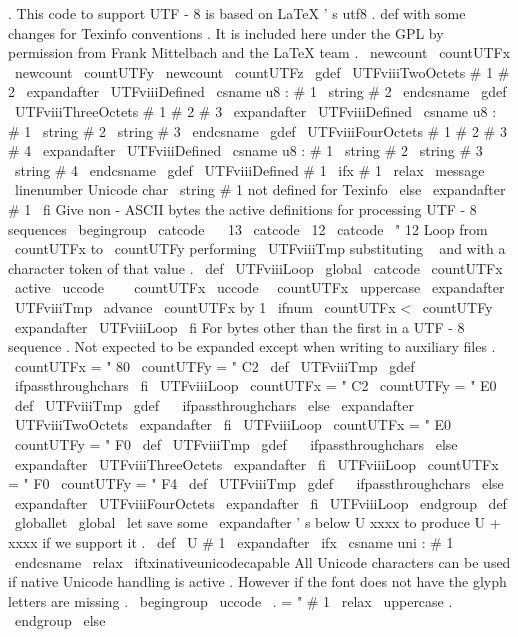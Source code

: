 {{{{.
%
%
This
code
to
support
UTF
-
8
is
based
on
LaTeX
'
s
utf8
.
def
with
some
%
changes
for
Texinfo
conventions
.
It
is
included
here
under
the
GPL
by
%
permission
from
Frank
Mittelbach
and
the
LaTeX
team
.
%
\
newcount
\
countUTFx
\
newcount
\
countUTFy
\
newcount
\
countUTFz
\
gdef
\
UTFviiiTwoOctets
#
1
#
2
{
\
expandafter
\
UTFviiiDefined
\
csname
u8
:
#
1
\
string
#
2
\
endcsname
}
%
\
gdef
\
UTFviiiThreeOctets
#
1
#
2
#
3
{
\
expandafter
\
UTFviiiDefined
\
csname
u8
:
#
1
\
string
#
2
\
string
#
3
\
endcsname
}
%
\
gdef
\
UTFviiiFourOctets
#
1
#
2
#
3
#
4
{
\
expandafter
\
UTFviiiDefined
\
csname
u8
:
#
1
\
string
#
2
\
string
#
3
\
string
#
4
\
endcsname
}
\
gdef
\
UTFviiiDefined
#
1
{
%
\
ifx
#
1
\
relax
\
message
{
\
linenumber
Unicode
char
\
string
#
1
not
defined
for
Texinfo
}
%
\
else
\
expandafter
#
1
%
\
fi
}
%
Give
non
-
ASCII
bytes
the
active
definitions
for
processing
UTF
-
8
sequences
\
begingroup
\
catcode
\
~
13
\
catcode
\
12
\
catcode
\
"
12
%
Loop
from
\
countUTFx
to
\
countUTFy
performing
\
UTFviiiTmp
%
substituting
~
and
with
a
character
token
of
that
value
.
\
def
\
UTFviiiLoop
{
%
\
global
\
catcode
\
countUTFx
\
active
\
uccode
\
~
\
countUTFx
\
uccode
\
\
countUTFx
\
uppercase
\
expandafter
{
\
UTFviiiTmp
}
%
\
advance
\
countUTFx
by
1
\
ifnum
\
countUTFx
<
\
countUTFy
\
expandafter
\
UTFviiiLoop
\
fi
}
%
For
bytes
other
than
the
first
in
a
UTF
-
8
sequence
.
Not
expected
to
%
be
expanded
except
when
writing
to
auxiliary
files
.
\
countUTFx
=
"
80
\
countUTFy
=
"
C2
\
def
\
UTFviiiTmp
{
%
\
gdef
~
{
%
\
ifpassthroughchars
\
fi
}
}
%
\
UTFviiiLoop
\
countUTFx
=
"
C2
\
countUTFy
=
"
E0
\
def
\
UTFviiiTmp
{
%
\
gdef
~
{
%
\
ifpassthroughchars
%
\
else
\
expandafter
\
UTFviiiTwoOctets
\
expandafter
\
fi
}
}
%
\
UTFviiiLoop
\
countUTFx
=
"
E0
\
countUTFy
=
"
F0
\
def
\
UTFviiiTmp
{
%
\
gdef
~
{
%
\
ifpassthroughchars
%
\
else
\
expandafter
\
UTFviiiThreeOctets
\
expandafter
\
fi
}
}
%
\
UTFviiiLoop
\
countUTFx
=
"
F0
\
countUTFy
=
"
F4
\
def
\
UTFviiiTmp
{
%
\
gdef
~
{
%
\
ifpassthroughchars
%
\
else
\
expandafter
\
UTFviiiFourOctets
\
expandafter
\
fi
}
}
%
\
UTFviiiLoop
\
endgroup
\
def
\
globallet
{
\
global
\
let
}
%
save
some
\
expandafter
'
s
below
%
U
{
xxxx
}
to
produce
U
+
xxxx
if
we
support
it
.
\
def
\
U
#
1
{
%
\
expandafter
\
ifx
\
csname
uni
:
#
1
\
endcsname
\
relax
\
iftxinativeunicodecapable
%
All
Unicode
characters
can
be
used
if
native
Unicode
handling
is
%
active
.
However
if
the
font
does
not
have
the
glyph
%
letters
are
missing
.
\
begingroup
\
uccode
\
.
=
"
#
1
\
relax
\
uppercase
{
.
}
\
endgroup
\
else
\
}}}}}
